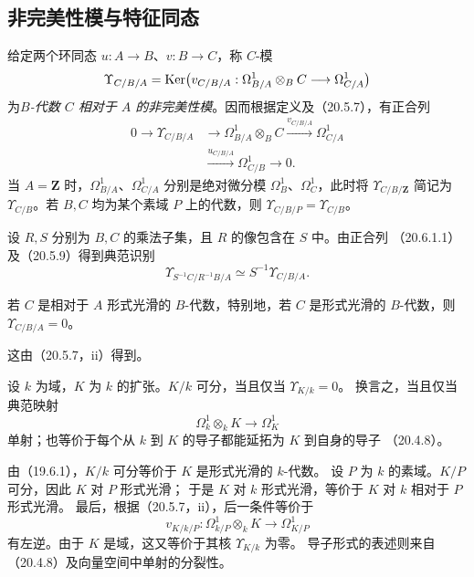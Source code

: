 \subsection{非完美性模与特征同态}
给定两个环同态 $u:A\to B$、$v:B\to C$，称 $C$-模
\[
 \Upsilon_{C/B/A}
 =\operatorname{Ker}\bigl(v_{C/B/A}:\Omega^1_{B/A}\otimes_B C\longrightarrow\Omega^1_{C/A}\bigr)
\]
为\emph{$B$-代数 $C$ 相对于 $A$ 的非完美性模}。因而根据定义及（20.5.7），有正合列
\begin{equation}
\begin{aligned}
0\longrightarrow\Upsilon_{C/B/A}
 &\longrightarrow\Omega^1_{B/A}\otimes_B C
 \xrightarrow{v_{C/B/A}}\Omega^1_{C/A}\\
 &\xrightarrow{u_{C/B/A}}\Omega^1_{C/B}\longrightarrow0.
\end{aligned}
\tag{20.6.1.1}
\end{equation}
当 $A=\mathbf Z$ 时，$\Omega^1_{B/A}$、$\Omega^1_{C/A}$ 分别是绝对微分模
$\Omega^1_B$、$\Omega^1_C$，此时将 $\Upsilon_{C/B/\mathbf Z}$ 简记为
$\Upsilon_{C/B}$。若 $B,C$ 均为某个素域 $P$ 上的代数，则
$\Upsilon_{C/B/P}=\Upsilon_{C/B}$。

设 $R,S$ 分别为 $B,C$ 的乘法子集，且 $R$ 的像包含在 $S$ 中。由正合列
（20.6.1.1）及（20.5.9）得到典范识别
\begin{equation}
 \Upsilon_{S^{-1}C/R^{-1}B/A}
 \simeq S^{-1}\Upsilon_{C/B/A}.
 \tag{20.6.1.2}
\end{equation}

若 $C$ 是相对于 $A$ 形式光滑的 $B$-代数，特别地，若 $C$ 是形式光滑的
$B$-代数，则 $\Upsilon_{C/B/A}=0$。

这由（20.5.7，ii）得到。

设 $k$ 为域，$K$ 为 $k$ 的扩张。$K/k$ 可分，当且仅当 $\Upsilon_{K/k}=0$。
换言之，当且仅当典范映射
\[
 \Omega^1_k\otimes_k K\longrightarrow\Omega^1_K
\]
单射；也等价于每个从 $k$ 到 $K$ 的导子都能延拓为 $K$ 到自身的导子
（20.4.8）。

由（19.6.1），$K/k$ 可分等价于 $K$ 是形式光滑的 $k$-代数。
设 $P$ 为 $k$ 的素域。$K/P$ 可分，因此 $K$ 对 $P$ 形式光滑；
于是 $K$ 对 $k$ 形式光滑，等价于 $K$ 对 $k$ 相对于 $P$ 形式光滑。
最后，根据（20.5.7，ii），后一条件等价于
\[
 v_{K/k/P}:\Omega^1_{k/P}\otimes_k K\longrightarrow\Omega^1_{K/P}
\]
有左逆。由于 $K$ 是域，这又等价于其核 $\Upsilon_{K/k}$ 为零。
导子形式的表述则来自（20.4.8）及向量空间中单射的分裂性。

